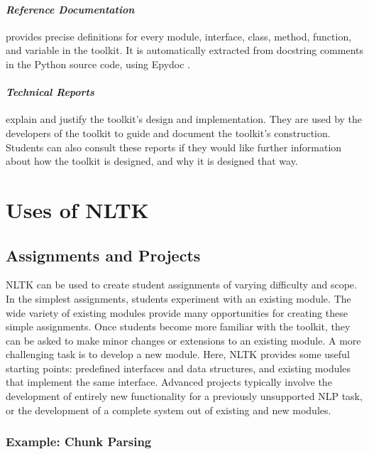 \documentclass[11pt]{article}
\begin{document}
\paragraph{\textit{Reference Documentation}} provides precise
definitions for every module, interface, class, method, function, and
variable in the toolkit.  It is automatically extracted from docstring
comments in the Python source code, using Epydoc \cite{epydoc}.

\paragraph{\textit{Technical Reports}} explain and justify the
toolkit's design and implementation.  They are used by the developers
of the toolkit to guide and document the toolkit's construction.
Students can also consult these reports if they would like further
information about how the toolkit is designed, and why it is designed
that way.

\section{Uses of NLTK}
\label{sec:uses}

\subsection{Assignments and Projects}

NLTK can be used to create student assignments of varying difficulty
and scope.  
In the simplest assignments, students experiment with an existing
module.  The wide variety of existing modules provide many opportunities
for creating these simple assignments.
Once students become more familiar with the toolkit, they can be asked
to make minor changes or extensions to an existing module.
A more challenging task is to develop a new module.  Here, NLTK
provides some useful starting points: predefined interfaces and data
structures, and existing modules that implement the same interface.
Advanced projects typically involve the development of entirely new
functionality for a previously unsupported NLP task, or the
development of a complete system out of existing and new modules.

\subsubsection*{Example: Chunk Parsing}
\end{document}
